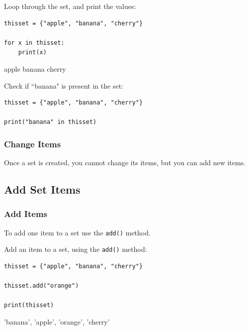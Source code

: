 \documentclass[12pt,a4paper]{article}
\newcommand{\code}[1]{%
	\colorbox{backcolour}{\lstinline{#1}}%
}
\newcommand{\lcode}[1]{%
	\lstinline{#1}%
}
\begin{document}
\begin{ebox}
Loop through the set, and print the values:
	\begin{lstlisting}
thisset = {"apple", "banana", "cherry"}

for x in thisset:
    print(x)
	\end{lstlisting}
\tcblower
	\begin{vercode}
apple
banana
cherry
	\end{vercode}
\end{ebox}

\begin{ebox}
Check if ``banana" is present in the set:
	\begin{lstlisting}
thisset = {"apple", "banana", "cherry"}

print("banana" in thisset)
	\end{lstlisting}
\tcblower
	\begin{vercode}

	\end{vercode}
\end{ebox}
\subsubsection{Change Items}

\begin{nbox}
Once a set is created, you cannot change its items, but you can add new items.
\end{nbox}
\subsection{Add Set Items}
\subsubsection{Add Items}

To add one item to a set use the \code{add()} method.

\begin{ebox}
Add an item to a set, using the \lcode{add()} method:
	\begin{lstlisting}
thisset = {"apple", "banana", "cherry"}

thisset.add("orange")

print(thisset)
	\end{lstlisting}
\tcblower
	\begin{vercode}
{'banana', 'apple', 'orange', 'cherry'}
	\end{vercode}
\end{ebox}
\end{document}
